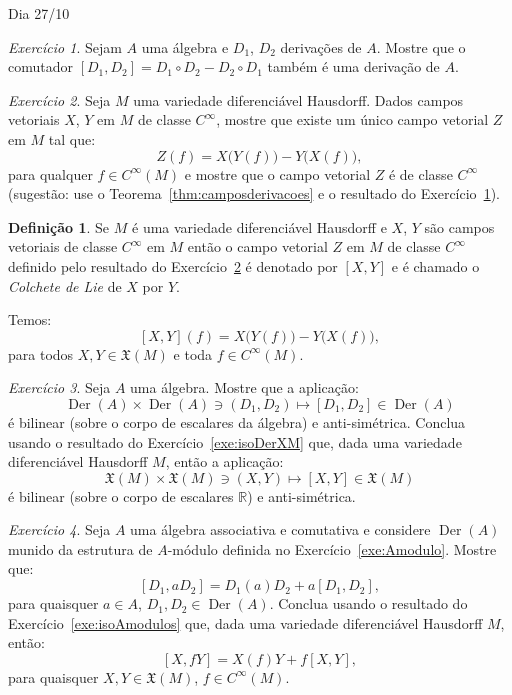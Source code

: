\documentclass[oneside,11pt]{amsart}
\newcommand{\R}{\mathds R}
\DeclareMathOperator{\Der}{Der}
\theoremstyle{remark}\newtheorem{exercise}{Exercício}[section]
\theoremstyle{plain}\newtheorem{teo}{Teorema}[section]
\theoremstyle{plain}\newtheorem{lem}[teo]{Lema}
\theoremstyle{plain}\newtheorem{prop}[teo]{Proposição}
\theoremstyle{definition}\newtheorem{defin}[teo]{Definição}
\theoremstyle{remark}\newtheorem{rem}[teo]{Observação}
\theoremstyle{definition}\newtheorem{example}[teo]{Exemplo}
\numberwithin{equation}{section}
\begin{document}
\begin{section}{Dia 27/10}

\begin{exercise}\label{exe:comutadorderivacoes}
Sejam $A$ uma álgebra e $D_1$, $D_2$ derivações de $A$. Mostre que o comutador $[D_1,D_2]=D_1\circ D_2-D_2\circ D_1$ também é uma derivação de $A$.
\end{exercise}

\begin{exercise}\label{exe:colchete}
Seja $M$ uma variedade diferenciável Hausdorff. Dados campos vetoriais $X$, $Y$ em $M$ de classe $C^\infty$, mostre que existe um único campo vetorial
$Z$ em $M$ tal que:
\[Z(f)=X\big(Y(f)\big)-Y\big(X(f)\big),\]
para qualquer $f\in C^\infty(M)$ e mostre que o campo vetorial $Z$ é de classe $C^\infty$ (sugestão: use o Teorema~\ref{thm:camposderivacoes} e o resultado do
Exercício~\ref{exe:comutadorderivacoes}).
\end{exercise}

\begin{defin}
Se $M$ é uma variedade diferenciável Hausdorff e $X$, $Y$ são campos vetoriais de classe $C^\infty$ em $M$ então o campo vetorial $Z$ em $M$ de classe $C^\infty$
definido pelo resultado do Exercício~\ref{exe:colchete} é denotado por $[X,Y]$ e é chamado o {\em Colchete de Lie\/} de $X$ por $Y$.
\end{defin}
Temos:
\begin{equation}\label{eq:defcolchete}
[X,Y](f)=X\big(Y(f)\big)-Y\big(X(f)\big),
\end{equation}
para todos $X,Y\in\mathfrak X(M)$ e toda $f\in C^\infty(M)$.

\begin{exercise}
Seja $A$ uma álgebra. Mostre que a aplicação:
\[\Der(A)\times\Der(A)\ni(D_1,D_2)\longmapsto[D_1,D_2]\in\Der(A)\]
é bilinear (sobre o corpo de escalares da álgebra) e anti-simétrica.
Conclua usando o resultado do Exercício~\ref{exe:isoDerXM} que, dada uma variedade diferenciável Hausdorff $M$, então a aplicação:
\[\mathfrak X(M)\times\mathfrak X(M)\ni(X,Y)\longmapsto[X,Y]\in\mathfrak X(M)\]
é bilinear (sobre o corpo de escalares $\R$) e anti-simétrica.
\end{exercise}

\begin{exercise}
Seja $A$ uma álgebra associativa e comutativa e considere $\Der(A)$ munido da estrutura de $A$-módulo definida no Exercício~\ref{exe:Amodulo}.
Mostre que:
\[[D_1,aD_2]=D_1(a)D_2+a[D_1,D_2],\]
para quaisquer $a\in A$, $D_1,D_2\in\Der(A)$. Conclua usando o resultado do Exercício~\ref{exe:isoAmodulos} que, dada uma variedade diferenciável Hausdorff $M$,
então:
\[[X,fY]=X(f)Y+f[X,Y],\]
para quaisquer $X,Y\in\mathfrak X(M)$, $f\in C^\infty(M)$.
\end{exercise}


\end{section}
\end{document}
